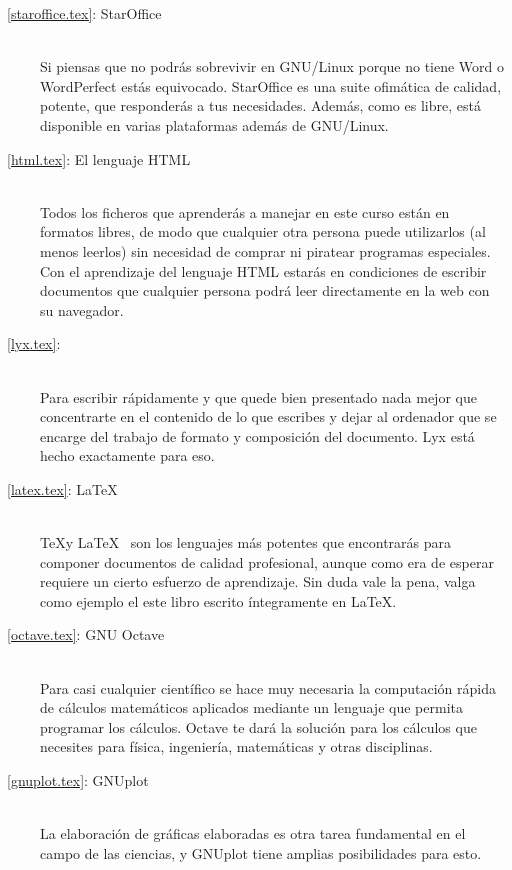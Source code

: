 \begin{description}
\item[\chaptername~\ref{staroffice.tex}:  StarOffice]  ~\\ Si  piensas
que  no  podrás  sobrevivir  en  GNU/Linux  porque  no  tiene  Word  o
WordPerfect  estás equivocado.  StarOffice es  una suite  ofimática de
calidad, potente, que  responderás a tus necesidades.  Además, como es
libre, está disponible en varias plataformas además de GNU/Linux.

\item[\chaptername~\ref{html.tex}:  El lenguaje  HTML]  ~\\ Todos  los
ficheros  que aprenderás  a manejar  en este  curso están  en formatos
libres, de modo que cualquier otra persona puede utilizarlos (al menos
leerlos) sin  necesidad de  comprar ni piratear  programas especiales.
Con  el  aprendizaje  del  lenguaje HTML  estarás  en  condiciones  de
escribir documentos  que cualquier persona podrá  leer directamente en
la web con su navegador.

\item[\chaptername~\ref{lyx.tex}: \LyX] ~\\  Para escribir rápidamente
y  que  quede  bien  presentado  nada mejor  que  concentrarte  en  el
contenido de lo  que escribes y dejar al ordenador  que se encarge del
trabajo  de  formato  y  composición del  documento.  Lyx  está  hecho
exactamente para eso.

\item[\chaptername~\ref{latex.tex}: \LaTeX] ~\\ \TeX y \LaTeX~ son los
lenguajes  más potentes  que encontrarás  para componer  documentos de
calidad profesional,  aunque como  era de  esperar requiere  un cierto
esfuerzo de aprendizaje. Sin duda vale  la pena, valga como ejemplo el
este libro escrito íntegramente en \LaTeX.

\item[\chaptername~\ref{octave.tex}:   GNU  Octave]   ~\\  Para   casi
cualquier científico  se hace muy  necesaria la computación  rápida de
cálculos  matemáticos  aplicados  mediante  un  lenguaje  que  permita
programar  los  cálculos.   Octave  te  dará  la   solución  para  los
cálculos que  necesites para  física, ingeniería, matemáticas  y otras
disciplinas.

\item[\chaptername~\ref{gnuplot.tex}: GNUplot]  ~\\ La  elaboración de
gráficas  elaboradas es  otra tarea  fundamental  en el  campo de  las
ciencias, y GNUplot tiene amplias posibilidades para esto.


\end{description}
